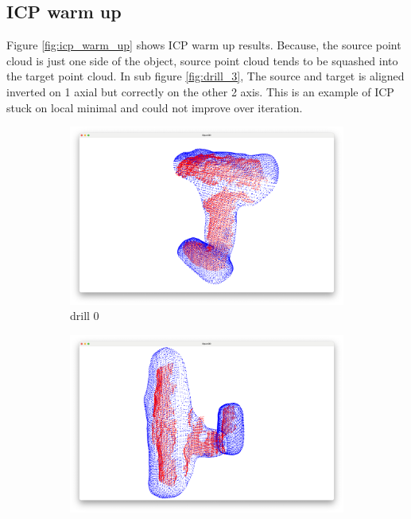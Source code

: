 \documentclass[conference]{IEEEtran}
\begin{document}
\appendix
\subsection{ICP warm up}
Figure \ref*{fig:icp_warm_up} shows ICP warm up results.
Because, the source point cloud is just one side of the object,
source point cloud tends to be squashed into the target point cloud.
In sub figure \ref*{fig:drill_3},
The source and target is aligned inverted on 1 axial but correctly on the other 2 axis.
This is an example of ICP stuck on local minimal and could not improve over iteration.

\begin{figure}
    \begin{subfigure}{0.24\textwidth}
        \includegraphics[width=\linewidth]{../code/icp_warm_up/drill_0.png}
        \caption{drill 0}
        \label{fig:drill_0}
    \end{subfigure}
    \hfill
    \begin{subfigure}{0.24\textwidth}
        \includegraphics[width=\linewidth]{../code/icp_warm_up/drill_1.png}

\end{subfigure}
\end{figure}
\end{document}
